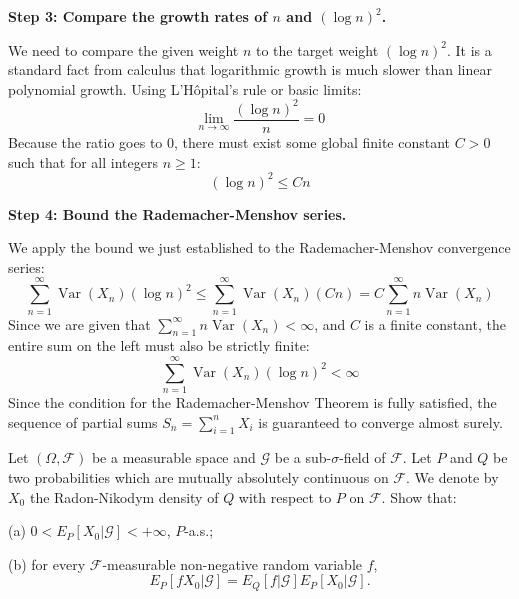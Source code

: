 \begin{solution}
\textbf{Step 3: Compare the growth rates of $n$ and $(\log n)^2$.}

We need to compare the given weight $n$ to the target weight $(\log n)^2$.
It is a standard fact from calculus that logarithmic growth is much slower than linear polynomial growth.
Using L'Hôpital's rule or basic limits:
\[ \lim_{n \to \infty} \frac{(\log n)^2}{n} = 0 \]
Because the ratio goes to 0, there must exist some global finite constant $C > 0$ such that for all integers $n \geq 1$:
\[ (\log n)^2 \leq C n \]

\textbf{Step 4: Bound the Rademacher-Menshov series.}

We apply the bound we just established to the Rademacher-Menshov convergence series:
\[ \sum_{n=1}^\infty \operatorname{Var}(X_n) (\log n)^2 \leq \sum_{n=1}^\infty \operatorname{Var}(X_n) (C n) = C \sum_{n=1}^\infty n \operatorname{Var}(X_n) \]
Since we are given that $\sum_{n=1}^\infty n \operatorname{Var}(X_n) < \infty$, and $C$ is a finite constant, the entire sum on the left must also be strictly finite:
\[ \sum_{n=1}^\infty \operatorname{Var}(X_n) (\log n)^2 < \infty \]
Since the condition for the Rademacher-Menshov Theorem is fully satisfied, the sequence of partial sums $S_n = \sum_{i=1}^n X_i$ is guaranteed to converge almost surely.
\end{solution}

\begin{exercise}\label{probability:2014:3}
Let $(\Omega, \mathcal{F})$ be a measurable space and $\mathcal{G}$ be a sub-$\sigma$-field of $\mathcal{F}$. Let $P$ and $Q$ be two probabilities which are mutually absolutely continuous on $\mathcal{F}$. We denote by $X_0$ the Radon-Nikodym density of $Q$ with respect to $P$ on $\mathcal{F}$. Show that:

(a) $0 < E_P[X_0 | \mathcal{G}] < +\infty$, $P$-a.s.;

(b) for every $\mathcal{F}$-measurable non-negative random variable $f$,
\[
E_P[fX_0 | \mathcal{G}] = E_Q[f | \mathcal{G}] E_P[X_0 | \mathcal{G}].
\]
\end{exercise}

